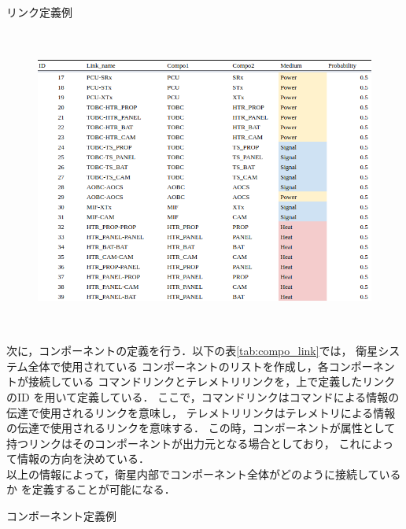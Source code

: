 \documentclass[11pt]{jsreport}
\begin{document}
\begin{table}[H]
   \centering
   \caption{リンク定義例}
   \label{tab:link_definition}
\end{table} 
\vspace{-2zh}
\begin{figure}[H]
   \centering
      \includegraphics[height=10cm]{figure/link_definition.png}
\end{figure}
\newpage
次に，コンポーネントの定義を行う．以下の表\ref{tab:compo_link}では，
衛星システム全体で使用されている
コンポーネントのリストを作成し，各コンポーネントが接続している
コマンドリンクとテレメトリリンクを，上で定義したリンクのID
を用いて定義している．
ここで，コマンドリンクはコマンドによる情報の伝達で使用されるリンクを意味し，
テレメトリリンクはテレメトリによる情報の伝達で使用されるリンクを意味する．
この時，コンポーネントが属性として持つリンクはそのコンポーネントが出力元となる場合としており，
これによって情報の方向を決めている．\\
以上の情報によって，衛星内部でコンポーネント全体がどのように接続しているか
を定義することが可能になる．
\begin{table}[H]
   \centering
   \caption{コンポーネント定義例}
   \label{tab:compo_link}
\end{table}
\vspace{-2zh}
\end{document}
